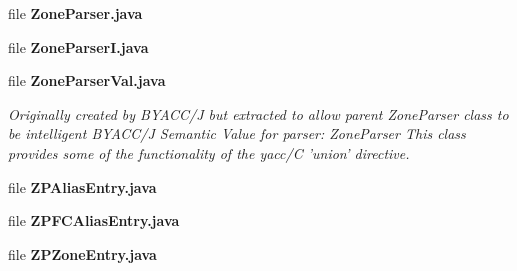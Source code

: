 \begin{DoxyCompactItemize}
file {\bf Zone\+Parser.\+java}
\item 
file {\bf Zone\+Parser\+I.\+java}
\item 
file {\bf Zone\+Parser\+Val.\+java}
\begin{DoxyCompactList}\small\item\em Originally created by B\+Y\+A\+C\+C/\+J but extracted to allow parent Zone\+Parser class to be intelligent B\+Y\+A\+C\+C/\+J Semantic Value for parser\+: Zone\+Parser This class provides some of the functionality of the yacc/\+C 'union' directive. \end{DoxyCompactList}\item 
file {\bf Z\+P\+Alias\+Entry.\+java}
\item 
file {\bf Z\+P\+F\+C\+Alias\+Entry.\+java}
\item 
file {\bf Z\+P\+Zone\+Entry.\+java}
\end{DoxyCompactItemize}
